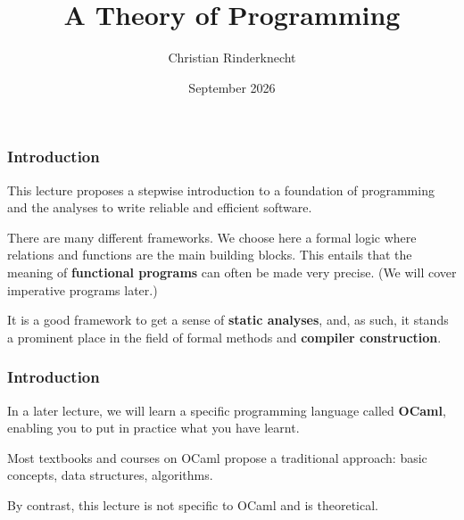 \documentclass[compress,dvipdfmx]{beamer}
\title{A Theory of Programming}
\author{Christian Rinderknecht}
\institute{Eszterházy Károly Katolikus Egyetem}
\date{September 2026}
\newcommand{\OCaml}{\textsf{OCaml}\xspace}
\begin{document}
\frame{\maketitle}

\begin{frame}
  \frametitle{Introduction}

  This lecture proposes a stepwise introduction to a foundation of
  programming and the analyses to write reliable and efficient
  software.

  \bigskip

  There are many different frameworks. We choose here a formal logic
  where relations and functions are the main building blocks. This
  entails that the meaning of \textbf{functional programs} can often
  be made very precise. (We will cover imperative programs later.)

  \bigskip

  It is a good framework to get a sense of \textbf{static analyses},
  and, as such, it stands a prominent place in the field of formal
  methods and \textbf{compiler construction}.

\end{frame}


\begin{frame}
  \frametitle{Introduction}

  In a later lecture, we will learn a specific programming language
  called \textbf{\OCaml}, enabling you to put in practice what you
  have learnt.

  \bigskip

  Most textbooks and courses on \OCaml propose a traditional approach:
  basic concepts, data structures, algorithms.

  \bigskip

  By contrast, this lecture is not specific to \OCaml and is
  theoretical.

\end{frame}
\end{document}
